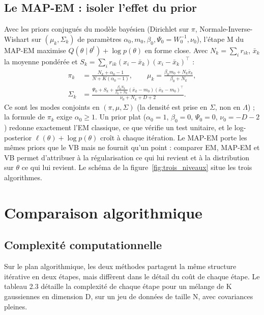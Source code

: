 \subsection{Le MAP-EM : isoler l'effet du prior}
Avec les priors conjugués du modèle bayésien (Dirichlet sur $\pi$, Normale-Inverse-Wishart sur $(\mu_k, \Sigma_k)$ de paramètres $\alpha_0, m_0, \beta_0, \Psi_0 = W_0^{-1}, \nu_0$), l'étape M du MAP-EM maximise $Q(\theta \mid \theta^t) + \log p(\theta)$ en forme close. Avec $N_k = \sum_i r_{ik}$, $\bar x_k$ la moyenne pondérée et $S_k = \sum_i r_{ik}(x_i - \bar x_k)(x_i - \bar x_k)^\top$ :
\begin{align*}
\pi_k &= \frac{N_k + \alpha_0 - 1}{N + K(\alpha_0 - 1)}, \qquad \mu_k = \frac{\beta_0 m_0 + N_k \bar x_k}{\beta_0 + N_k},\\
\Sigma_k &= \frac{\Psi_0 + S_k + \frac{\beta_0 N_k}{\beta_0 + N_k}(\bar x_k - m_0)(\bar x_k - m_0)^\top}{\nu_0 + N_k + D + 2}.
\end{align*}
Ce sont les modes conjoints en $(\pi, \mu, \Sigma)$ (la densité est prise en $\Sigma$, non en $\Lambda$) ; la formule de $\pi_k$ exige $\alpha_0 \geq 1$. Un prior plat ($\alpha_0 = 1$, $\beta_0 = 0$, $\Psi_0 = 0$, $\nu_0 = -D-2$) redonne exactement l'EM classique, ce que vérifie un test unitaire, et le log-posterior $\ell(\theta) + \log p(\theta)$ croît à chaque itération. Le MAP-EM porte les mêmes priors que le VB mais ne fournit qu'un point : comparer EM, MAP-EM et VB permet d'attribuer à la régularisation ce qui lui revient et à la distribution sur $\theta$ ce qui lui revient. Le schéma de la figure~\ref{fig:trois_niveaux} situe les trois algorithmes.




\section{Comparaison algorithmique}
\subsection{Complexité computationnelle}
Sur le plan algorithmique, les deux méthodes partagent la même structure itérative en deux étapes, mais diffèrent dans le détail du coût de chaque étape. Le tableau 2.3 détaille la complexité de chaque étape pour un mélange de K gaussiennes en dimension D, sur un jeu de données de taille N, avec covariances pleines.

